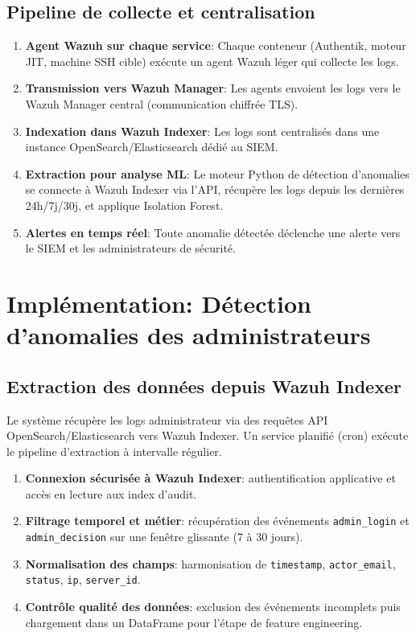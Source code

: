\subsection{Pipeline de collecte et centralisation}

\begin{enumerate}
	\item \textbf{Agent Wazuh sur chaque service}: Chaque conteneur (Authentik, moteur JIT, machine SSH cible) exécute un agent Wazuh léger qui collecte les logs.
	
	\item \textbf{Transmission vers Wazuh Manager}: Les agents envoient les logs vers le Wazuh Manager central (communication chiffrée TLS).
	
	\item \textbf{Indexation dans Wazuh Indexer}: Les logs sont centralisés dans une instance OpenSearch/Elasticsearch dédié au SIEM.
	
	\item \textbf{Extraction pour analyse ML}: Le moteur Python de détection d'anomalies se connecte à Wazuh Indexer via l'API, récupère les logs depuis les dernières 24h/7j/30j, et applique Isolation Forest.
	
	\item \textbf{Alertes en temps réel}: Toute anomalie détectée déclenche une alerte vers le SIEM et les administrateurs de sécurité.
\end{enumerate}

\section{Implémentation: Détection d'anomalies des administrateurs}

\subsection{Extraction des données depuis Wazuh Indexer}

Le système récupère les logs administrateur via des requêtes API OpenSearch/Elasticsearch vers Wazuh Indexer.
Un service planifié (cron) exécute le pipeline d'extraction à intervalle régulier.

\begin{enumerate}
	\item \textbf{Connexion sécurisée à Wazuh Indexer}: authentification applicative et accès en lecture aux index d'audit.
	
	\item \textbf{Filtrage temporel et métier}: récupération des événements \texttt{admin\_login} et \texttt{admin\_decision} sur une fenêtre glissante (7 à 30 jours).
	
	\item \textbf{Normalisation des champs}: harmonisation de \texttt{timestamp}, \texttt{actor\_email}, \texttt{status}, \texttt{ip}, \texttt{server\_id}.
	
	\item \textbf{Contrôle qualité des données}: exclusion des événements incomplets puis chargement dans un DataFrame pour l'étape de feature engineering.
\end{enumerate}

